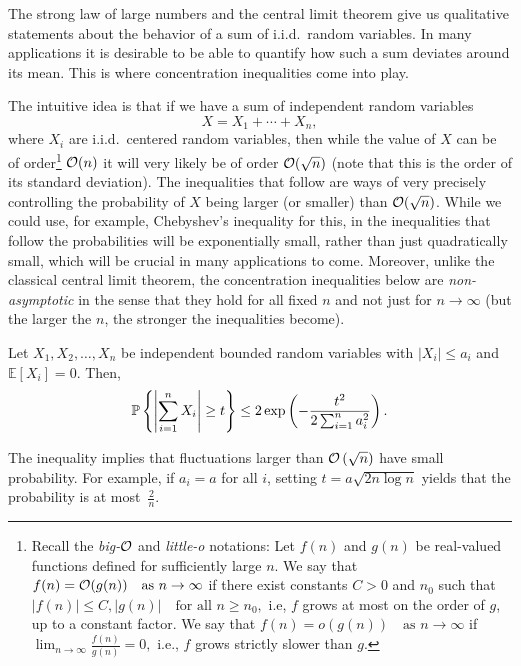 The strong law of large numbers and the central limit theorem give us qualitative statements about the behavior of a sum of i.i.d.\ random variables. In many applications it is desirable to be able to quantify how such a sum deviates around its mean. This is where concentration inequalities
come into play.

The intuitive idea is that if we have a sum of independent random variables
\[
X = X_1 + \cdots + X_n,
\]
where $X_i$ are i.i.d.\ centered random variables, then while the value of $X$ can be of order\footnote{Recall the {\em big-$\mathcal{O}$} and {\em little-o} notations:
Let $f(n)$ and $g(n)$ be real-valued functions defined for sufficiently large $n$. We say that
$
f(n) = \mathcal{O}(g(n)) \quad \text{as } n \to \infty
$
if there exist constants $C > 0$ and $n_0$ such that
$
|f(n)| \le C,|g(n)| \quad \text{for all } n \ge n_0,
$
i.e, $f$ grows at most on the order of $g$, up to a constant factor.
We say that
$
f(n) = o(g(n)) \quad \text{as } n \to \infty
$
if
$
\lim_{n \to \infty} \frac{f(n)}{g(n)} = 0,
$
i.e., $f$ grows strictly slower than $g$.}
$\mathcal{O}(n)$ it will very likely be of order $\mathcal{O}(\sqrt{n})$ (note that this is the order of its standard deviation). The inequalities that follow are ways of very precisely controlling the probability of $X$ being larger (or smaller) than $\mathcal{O}(\sqrt{n})$. While we could use, for example, Chebyshev's inequality for this, in the inequalities that follow the probabilities will be exponentially small, rather than just quadratically small, which will be crucial in many applications to come.
Moreover,  unlike the classical central limit theorem, the concentration inequalities below are {\em non-asymptotic} in the sense that they hold
for all fixed $n$ and not just for $n \to \infty$ (but the larger the $n$,  the stronger the inequalities become).


\begin{theorem}\label{thm:hoeffding1}
 Let $X_1,X_2,\ldots,X_n$ be independent bounded random variables with $|X_i| \leq a_i$ and $\mathbb{E}[X_i]=0$. Then,
 $${\mathbb{P}}\left\{\left|\sum_{i=1}^n X_i\right|\geq t\right\}\le 2\exp\left(-\displaystyle{\frac{t^2}{2 \sum_{i=1}^n a_i^2}}\right).$$
\end{theorem}


The inequality implies that fluctuations larger than $\mathcal{O}\left(\sqrt{n}\right)$ have small probability. For example, if $a_i=a$ for all $i$, setting $t=a\sqrt{2n\log n}$ yields that the probability is at most~$\frac{2}{n}$.


